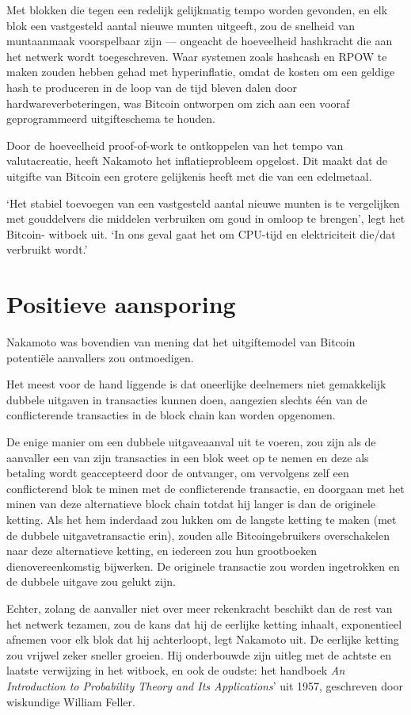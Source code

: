\documentclass[smalldemyvopaper,11pt,twoside,onecolumn,openright,extrafontsizes,hidelinks]{memoir}
\begin{document}
Met blokken die tegen een redelijk gelijkmatig tempo worden gevonden, en
elk blok een vastgesteld aantal nieuwe munten uitgeeft, zou de snelheid
van muntaanmaak voorspelbaar zijn --- ongeacht de hoeveelheid hashkracht
die aan het netwerk wordt toegeschreven. Waar systemen zoals hashcash en
RPOW te maken zouden hebben gehad met hyperinflatie, omdat de kosten om
een geldige hash te produceren in de loop van de tijd bleven dalen door
hardwareverbeteringen, was Bitcoin ontworpen om zich aan een vooraf
geprogrammeerd uitgifteschema te houden.

Door de hoeveelheid proof-of-work te ontkoppelen van het tempo van
valutacreatie, heeft Nakamoto het inflatieprobleem opgelost. Dit maakt
dat de uitgifte van Bitcoin een grotere gelijkenis heeft met die van een
edelmetaal.

`Het stabiel toevoegen van een vastgesteld aantal nieuwe munten is te
vergelijken met gouddelvers die middelen verbruiken om goud in omloop te
brengen', legt het Bitcoin- witboek uit. `In ons geval gaat het om
CPU-tijd en elektriciteit die/dat verbruikt wordt.'

\section{Positieve aansporing}\label{positieve-aansporing}

Nakamoto was bovendien van mening dat het uitgiftemodel van Bitcoin
potentiële aanvallers zou ontmoedigen.

Het meest voor de hand liggende is dat oneerlijke deelnemers niet
gemakkelijk dubbele uitgaven in transacties kunnen doen, aangezien
slechts één van de conflicterende transacties in de block chain kan
worden opgenomen.

De enige manier om een dubbele uitgaveaanval uit te voeren, zou zijn als
de aanvaller een van zijn transacties in een blok weet op te nemen en
deze als betaling wordt geaccepteerd door de ontvanger, om vervolgens
zelf een conflicterend blok te minen met de conflicterende transactie,
en doorgaan met het minen van deze alternatieve block chain totdat hij
langer is dan de originele ketting. Als het hem inderdaad zou lukken om
de langste ketting te maken (met de dubbele uitgavetransactie erin),
zouden alle Bitcoingebruikers overschakelen naar deze alternatieve
ketting, en iedereen zou hun grootboeken dienovereenkomstig bijwerken.
De originele transactie zou worden ingetrokken en de dubbele uitgave zou
gelukt zijn.

Echter, zolang de aanvaller niet over meer rekenkracht beschikt dan de
rest van het netwerk tezamen, zou de kans dat hij de eerlijke ketting
inhaalt, exponentieel afnemen voor elk blok dat hij achterloopt, legt
Nakamoto uit. De eerlijke ketting zou vrijwel zeker sneller groeien. Hij
onderbouwde zijn uitleg met de achtste en laatste verwijzing in het
witboek, en ook de oudste: het handboek \emph{An Introduction to
Probability Theory and Its Applications}' uit 1957, geschreven door
wiskundige William Feller.
\end{document}
